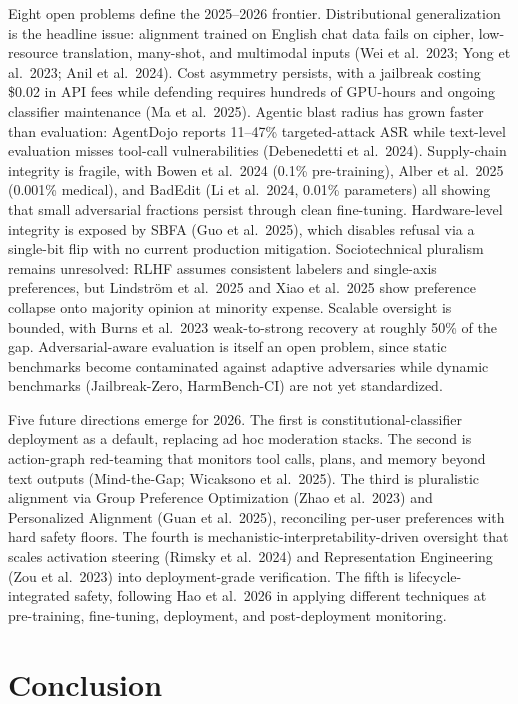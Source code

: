 Eight open problems define the 2025--2026 frontier. Distributional generalization is the headline issue: alignment trained on English chat data fails on cipher, low-resource translation, many-shot, and multimodal inputs (Wei et al.~2023; Yong et al.~2023; Anil et al.~2024). Cost asymmetry persists, with a jailbreak costing \$0.02 in API fees while defending requires hundreds of GPU-hours and ongoing classifier maintenance (Ma et al.~2025). Agentic blast radius has grown faster than evaluation: AgentDojo reports 11--47\% targeted-attack ASR while text-level evaluation misses tool-call vulnerabilities (Debenedetti et al.~2024). Supply-chain integrity is fragile, with Bowen et al.~2024 (0.1\% pre-training), Alber et al.~2025 (0.001\% medical), and BadEdit (Li et al.~2024, 0.01\% parameters) all showing that small adversarial fractions persist through clean fine-tuning. Hardware-level integrity is exposed by SBFA (Guo et al.~2025), which disables refusal via a single-bit flip with no current production mitigation. Sociotechnical pluralism remains unresolved: RLHF assumes consistent labelers and single-axis preferences, but Lindström et al.~2025 and Xiao et al.~2025 show preference collapse onto majority opinion at minority expense. Scalable oversight is bounded, with Burns et al.~2023 weak-to-strong recovery at roughly 50\% of the gap. Adversarial-aware evaluation is itself an open problem, since static benchmarks become contaminated against adaptive adversaries while dynamic benchmarks (Jailbreak-Zero, HarmBench-CI) are not yet standardized.

Five future directions emerge for 2026. The first is constitutional-classifier deployment as a default, replacing ad hoc moderation stacks. The second is action-graph red-teaming that monitors tool calls, plans, and memory beyond text outputs (Mind-the-Gap; Wicaksono et al.~2025). The third is pluralistic alignment via Group Preference Optimization (Zhao et al.~2023) and Personalized Alignment (Guan et al.~2025), reconciling per-user preferences with hard safety floors. The fourth is mechanistic-interpretability-driven oversight that scales activation steering (Rimsky et al.~2024) and Representation Engineering (Zou et al.~2023) into deployment-grade verification. The fifth is lifecycle-integrated safety, following Hao et al.~2026 in applying different techniques at pre-training, fine-tuning, deployment, and post-deployment monitoring.

\section{Conclusion}\label{conclusion}

